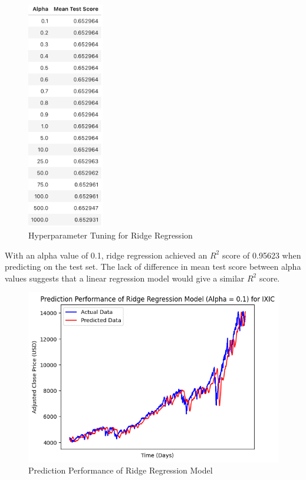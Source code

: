 \documentclass[a4paper, 11pt]{article}
\begin{document}
\begin{figure}[H]
    \begin{center}
        \includegraphics[width=0.3\textwidth]{Hyperparameter Tuning for Ridge Regression.png}
        \caption{Hyperparameter Tuning for Ridge Regression}
    \end{center}
\end{figure}

With an alpha value of 0.1, ridge regression achieved an $R^2$ score of 0.95623 when predicting on the test set. The lack of difference in mean test score between alpha values suggests that a linear regression model would give a similar $R^2$ score.

\begin{figure}[H]
    \begin{center}
        \includegraphics[width=1\textwidth]{Prediction Performance of Ridge Regression Model.png}
        \caption{Prediction Performance of Ridge Regression Model}
    \end{center}
\end{figure}
\end{document}
